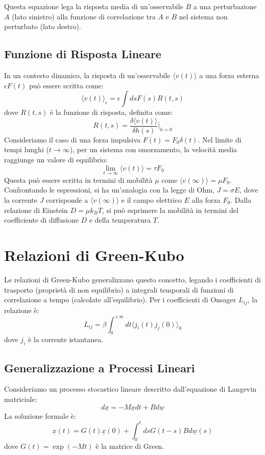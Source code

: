 Questa equazione lega la risposta media di un'osservabile $B$ a una perturbazione $A$ (lato sinistro) alla funzione di correlazione tra $A$ e $B$ nel sistema non perturbato (lato destro).

\subsection{Funzione di Risposta Lineare}
In un contesto dinamico, la risposta di un'osservabile $\langle v(t) \rangle$ a una forza esterna $\epsilon F(t)$ può essere scritta come:
\begin{equation}
 \langle v(t) \rangle_\epsilon = \epsilon \int ds F(s) R(t,s)
\end{equation}
dove $R(t,s)$ è la funzione di risposta, definita come:
\begin{equation}
 R(t,s) = \frac{\delta \langle v(t) \rangle}{\delta h(s)} \bigg|_{h=0}
\end{equation}
Consideriamo il caso di una forza impulsiva $F(t) = F_0 \delta(t)$. Nel limite di tempi lunghi ($t \rightarrow \infty$), per un sistema con smorzamento, la velocità media raggiunge un valore di equilibrio:
\begin{equation}
 \lim_{t \to \infty} \langle v(t) \rangle = \tau F_0
\end{equation}
Questa può essere scritta in termini di mobilità $\mu$ come $\langle v(\infty) \rangle = \mu F_0$. Confrontando le espressioni, si ha un'analogia con la legge di Ohm, $J = \sigma E$, dove la corrente $J$ corrisponde a $\langle v(\infty) \rangle$ e il campo elettrico $E$ alla forza $F_0$. Dalla relazione di Einstein $D = \mu k_B T$, si può esprimere la mobilità in termini del coefficiente di diffusione $D$ e della temperatura $T$.

\section{Relazioni di Green-Kubo}
Le relazioni di Green-Kubo generalizzano questo concetto, legando i coefficienti di trasporto (proprietà di non equilibrio) a integrali temporali di funzioni di correlazione a tempo (calcolate all'equilibrio). Per i coefficienti di Onsager $L_{ij}$, la relazione è:
\begin{equation}
 L_{ij} = \beta \int_0^{+\infty} dt \langle j_i(t) j_j(0) \rangle_0
\end{equation}
dove $j_i$ è la corrente istantanea.

\subsection{Generalizzazione a Processi Lineari}
Consideriamo un processo stocastico lineare descritto dall'equazione di Langevin matriciale:
\begin{equation}
 d\underline{x} = -M\underline{x} dt + B d\underline{w}
\end{equation}
La soluzione formale è:
\begin{equation}
 \underline{x}(t) = G(t)\underline{x}(0) + \int_0^t ds G(t-s) B d\underline{w}(s)
\end{equation}
dove $G(t) = \exp(-Mt)$ è la matrice di Green.

